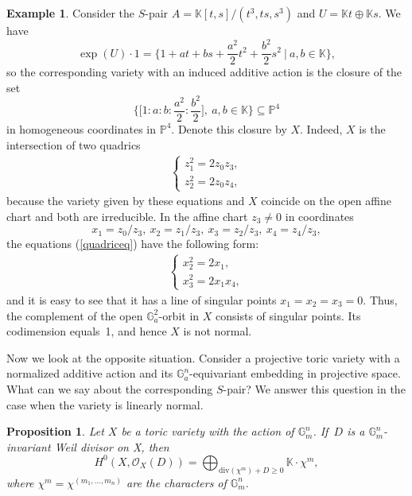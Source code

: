 \documentclass[a4paper,draft,reqno,12pt]{amsart}
\newtheorem{proposition}{Proposition}
\theoremstyle{definition}
\theoremstyle{definition}
\newtheorem{example}{Example}
\theoremstyle{remark}
\def\BG{{\mathbb G}}
\def\BK{{\mathbb K}}
\def\BG{{\mathbb G}}
\def\BK{{\mathbb K}}
\def\BP{{\mathbb P}}
\def\CO{\mathcal{O}}
\def\div{\mathrm{div}}
\begin{document}
\begin{example}\label{nonnormalinduced}
    Consider the $S$-pair $A = \BK[t,s]/(t^3,ts,s^3)$ and $U = \BK t \oplus \BK s$. We have \begin{equation*}
        \exp(U)\cdot 1 = \Big\{1 + at + bs + \frac{a^2}{2}t^2+\frac{b^2}{2}s^2 \ \Big| \ a,b\in\BK\Big\},
    \end{equation*} so the corresponding variety with an induced additive action is the closure of the set \begin{equation*}
        \Big\{\Big[1:a:b:\frac{a^2}{2}:\frac{b^2}{2}\Big], \ a,b\in\BK\Big\} \subseteq \BP^4
    \end{equation*} in homogeneous coordinates in $\BP^4$. Denote this closure by $X$. Indeed, $X$ is the intersection of two quadrics \begin{gather}\label{quadriceq}
        \begin{cases}
            z_1^2 = 2z_0z_3, \\
            z_2^2 = 2z_0z_4,
        \end{cases}
    \end{gather} because the variety given by these equations and $X$ coincide on the open affine chart and both are irreducible. In the affine chart $z_3\neq0$ in coordinates \begin{equation*}
        x_1 = z_0/z_3, \ x_2 = z_1/z_3, \ x_3 = z_2/z_3, \ x_4 = z_4/z_3,
    \end{equation*} the equations (\ref{quadriceq}) have the following form: \begin{gather*}
        \begin{cases}
            x_2^2 = 2x_1, \\
            x_3^2 = 2x_1x_4,
        \end{cases}
    \end{gather*} and it is easy to see that it has a line of singular points $x_1=x_2=x_3=0$. Thus, the complement of the open $\BG_a^2$-orbit in $X$ consists of singular points. Its codimension equals~1, and hence $X$ is not normal. 
\end{example}

Now we look at the opposite situation. Consider a projective toric variety with a normalized additive action and its $\BG_a^n$-equivariant embedding in projective space. What can we say about the corresponding $S$-pair? We answer this question in the case when the variety is linearly normal.

\begin{proposition}\cite[Proposition 4.3.2]{C}\label{sectionstoric}
    Let $X$ be a toric variety with the action of $\BG_m^n$. If~$D$ is a $\BG_m^n$-invariant Weil divisor on X, then \begin{equation}
        H^0(X, \CO_X(D)) = \bigoplus_{\div(\chi^m)+D\geq0}\BK\cdot\chi^m,
    \end{equation} where $\chi^m = \chi^{(m_1,\dotsc,m_n)}$ are the characters of $\BG_m^n$.
\end{proposition}
\end{document}

